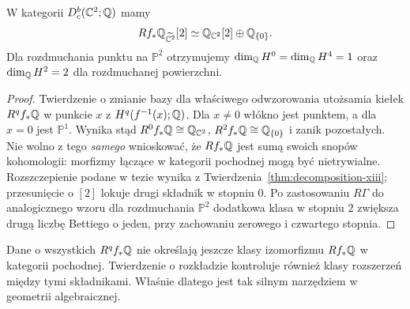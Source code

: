 \begin{stwierdzenie}
\label{prop:blowup-decomp-xiii}
W kategorii $D_c^b(\mathbb{C}^2;\mathbb{Q})$ mamy
\[
Rf_*\mathbb{Q}_{\widetilde{\mathbb{C}^2}}[2]
\simeq\mathbb{Q}_{\mathbb{C}^2}[2]\oplus\mathbb{Q}_{\{0\}}.
\]
Dla rozdmuchania punktu na $\mathbb P^2$ otrzymujemy
$\dim_{\mathbb{Q}} H^0=\dim_{\mathbb{Q}} H^4=1$ oraz
$\dim_{\mathbb{Q}} H^2=2$ dla rozdmuchanej powierzchni.
\end{stwierdzenie}
\begin{proof}
Twierdzenie o zmianie bazy dla właściwego odwzorowania
utożsamia kiełek $R^qf_*\mathbb{Q}$ w punkcie $x$
z $H^q(f^{-1}(x);\mathbb{Q})$. Dla $x\ne0$ włókno jest
punktem, a dla $x=0$ jest $\mathbb P^1$.
Wynika stąd $R^0f_*\mathbb{Q}\cong\mathbb{Q}_{\mathbb{C}^2}$,
$R^2f_*\mathbb{Q}\cong\mathbb{Q}_{\{0\}}$ i zanik pozostałych.
Nie wolno z tego \emph{samego} wnioskować, że
$Rf_*\mathbb{Q}$ jest sumą swoich snopów kohomologii:
morfizmy łączące w kategorii pochodnej mogą
być nietrywialne. Rozszczepienie podane w tezie
wynika z Twierdzenia~\ref{thm:decomposition-xiii};
przesunięcie o $[2]$ lokuje drugi składnik
w stopniu $0$. Po zastosowaniu $R\Gamma$
do analogicznego wzoru dla rozdmuchania $\mathbb P^2$
dodatkowa klasa w stopniu $2$ zwiększa drugą
liczbę Bettiego o jeden, przy zachowaniu zerowego
i czwartego stopnia.
\end{proof}
\begin{uwaga}
Dane o wszystkich $R^qf_*\mathbb{Q}$ nie określają
jeszcze klasy izomorfizmu $Rf_*\mathbb{Q}$ w kategorii
pochodnej. Twierdzenie o rozkładzie kontroluje
również klasy rozszerzeń między tymi składnikami.
Właśnie dlatego jest tak silnym narzędziem
w geometrii algebraicznej.
\end{uwaga}

